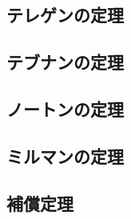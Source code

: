 \documentclass{jsarticle}
\begin{document}
        \subsection{テレゲンの定理}
        \subsection{テブナンの定理}
        \subsection{ノートンの定理}
        \subsection{ミルマンの定理}
        \subsection{補償定理}
\end{document}
